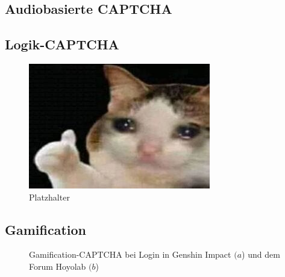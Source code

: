 \subsection{Audiobasierte CAPTCHA}
\subsection{Logik-CAPTCHA}
\begin{figure}
    \centering
    \includegraphics{gfx/mygraphics/platzhalter.png}
    \caption{Platzhalter}
    \label{fig:platzhalter}
\end{figure}
\subsection{Gamification}

\begin{figure}
    \centering
    \qquad
    \caption{Gamification-CAPTCHA bei Login in Genshin Impact $(a$) und dem Forum Hoyolab $(b$)}   
\end{figure}

